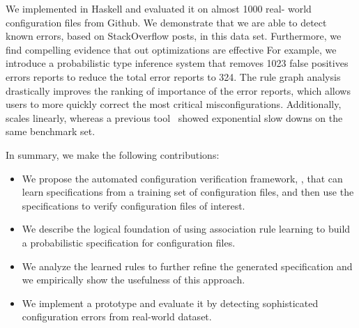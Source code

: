 We implemented \app in Haskell  and evaluated it on almost 1000 real-
world configuration files from Github.
We demonstrate that we are able to detect known errors, based on 
StackOverflow posts, in this data set.
Furthermore, we find compelling evidence that out optimizations are 
effective
For example, we introduce a probabilistic type inference system that removes 1023 false 
positives errors reports to reduce the total error reports to 324.
The rule graph analysis drastically improves the ranking of importance of 
the error reports, which allows users to more quickly correct the most 
critical misconfigurations.
Additionally, \app scales linearly, whereas 
a previous tool~\cite{santolucitoCAV} showed exponential slow downs on 
the same benchmark set.

In summary, we make the following contributions:
\begin{itemize}
\item We propose the automated configuration verification
framework, \app, that can learn specifications from a training set
of configuration files, and then use the specifications to verify 
configuration files of interest.
\item We describe the logical foundation of using association rule learning to build a probabilistic specification for configuration files. 
\item We analyze the learned rules to further refine the generated specification and we empirically show the usefulness of this approach.
\item We implement a \app prototype and evaluate it by
detecting sophisticated configuration errors 
from real-world dataset.

\end{itemize}


